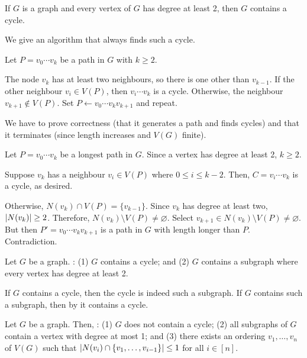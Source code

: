 \documentclass[class=math239,notes,tikz]{agony}
\begin{document}
\begin{theorem}[4.6.4]\label{thm:deg2cycle}
  If $G$ is a graph and every vertex of $G$ has degree at least 2,
  then $G$ contains a cycle.
\end{theorem}
\begin{prf}
  We give an algorithm that always finds such a cycle.

  Let $P = v_0\cdots v_k$ be a path in $G$ with $k \geq 2$.

  The node $v_k$ has at least two neighbours, so there is one other than $v_{k-1}$.
  If the other neighbour $v_i \in V(P)$,
  then $v_i \cdots v_k$ is a cycle.
  Otherwise, the neighbour $v_{k+1} \not\in V(P)$.
  Set $P \gets v_0\cdots v_k v_{k+1}$ and repeat.

  We have to prove correctness (that it generates a path and finds cycles)
  and that it terminates (since length increases and $V(G)$ finite).
\end{prf}
\begin{prf}
  Let $P = v_0 \cdots v_k$ be a longest path in $G$.
  Since a vertex has degree at least 2, $k \geq 2$.

  Suppose $v_k$ has a neighbour $v_i \in V(P)$ where $0 \leq i \leq k-2$.
  Then, $C = v_i \cdots v_k$ is a cycle, as desired.

  Otherwise, $N(v_k) \cap V(P) = \{v_{k-1}\}$.
  Since $v_k$ has degree at least two, $\abs{N(v_k)} \geq 2$.
  Therefore, $N(v_k) \setminus V(P) \neq \varnothing$.
  Select $v_{k+1} \in N(v_k) \setminus V(P) \neq \varnothing$.
  But then $P' = v_0 \cdots v_k v_{k+1}$ is a path in $G$ with length longer than $P$.
  Contradiction.
\end{prf}
\begin{corollary}\label{cor:464-pos}
  Let $G$ be a graph. \TFAE:
  (1) $G$ contains a cycle; and
  (2) $G$ contains a subgraph where every vertex has degree at least 2.
\end{corollary}
\begin{prf}
  If $G$ contains a cycle, then the cycle is indeed such a subgraph.
  If $G$ contains such a subgraph, then by  it contains a cycle.
\end{prf}
\begin{corollary}\label{cor:464-neg}
  Let $G$ be a graph. Then, \Tfae:
  (1) $G$ does not contain a cycle;
  (2) all subgraphs of $G$ contain a vertex with degree at most 1; and
  (3) there exists an ordering $v_1,\dotsc,v_n$ of $V(G)$ such that
  $\abs{N(v_i) \cap \{v_1,\dotsc,v_{i-1}\}} \leq 1$ for all $i \in [n]$.
\end{corollary}
\end{document}
